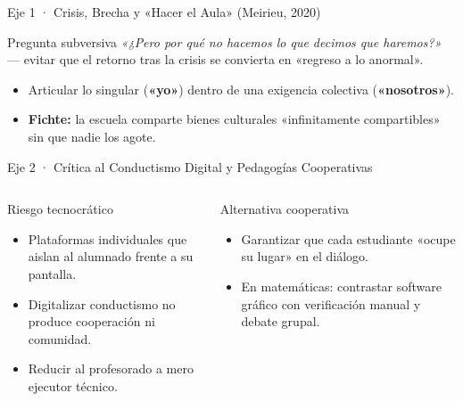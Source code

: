 \documentclass[aspectratio=169,spanish,xcolor=table]{beamer}
\begin{document}
\begin{frame}{Eje 1 · Crisis, Brecha y «Hacer el Aula» (Meirieu, 2020)}
  \begin{block}{Pregunta subversiva}
    \textit{«¿Pero por qué no hacemos lo que decimos que haremos?»} — evitar que el retorno tras la crisis se convierta en «regreso a lo anormal».
  \end{block}
  \vspace{0.25cm}
  \begin{itemize}\normalsize
    \item Articular lo singular (\textbf{«yo»}) dentro de una exigencia colectiva (\textbf{«nosotros»}).
    \item \textbf{Fichte:} la escuela comparte bienes culturales «infinitamente compartibles» sin que nadie los agote.
  \end{itemize}
\end{frame}

\begin{frame}{Eje 2 · Crítica al Conductismo Digital y Pedagogías Cooperativas}
  \begin{columns}[T]
      \begin{block}{Riesgo tecnocrático}
        \begin{itemize}\scriptsize
          \item Plataformas individuales que aislan al alumnado frente a su pantalla.
          \item Digitalizar conductismo no produce cooperación ni comunidad.
          \item Reducir al profesorado a mero ejecutor técnico.
        \end{itemize}
      \end{block}
      \begin{block}{Alternativa cooperativa}
        \begin{itemize}\scriptsize
          \item Garantizar que cada estudiante «ocupe su lugar» en el diálogo.
          \item En matemáticas: contrastar software gráfico con verificación manual y debate grupal.
        \end{itemize}
      \end{block}
  \end{columns}
\end{frame}
\end{document}
